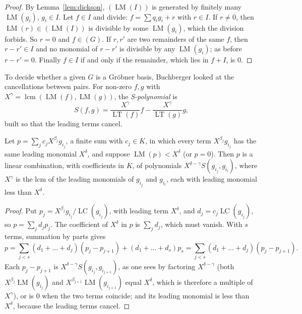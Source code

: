 \begin{proof}
By Lemma~\ref{lem:dickson}, $(\operatorname{LM}(I))$ is generated by finitely many $\operatorname{LM}(g_i)$, $g_i\in I$. Let $f\in I$ and divide: $f=\sum q_ig_i+r$ with $r\in I$. If $r\ne0$, then $\operatorname{LM}(r)\in(\operatorname{LM}(I))$ is divisible by some
$\operatorname{LM}(g_i)$, which the division forbids. So $r=0$ and $f\in(G)$. If $r,r'$ are two remainders of the same $f$, then $r-r'\in I$ and no monomial of $r-r'$ is divisible by any $\operatorname{LM}(g_i)$; as before $r-r'=0$. Finally
$f\in I$ if and only if the remainder, which lies in $f+I$, is $0$.
\end{proof}

To decide whether a given $G$ is a Gröbner basis, Buchberger looked at the cancellations between pairs. For non-zero $f,g$ with $X^\gamma=\operatorname{lcm}(\operatorname{LM}(f),\operatorname{LM}(g))$, the \emph{S-polynomial} is
\[S(f,g)=\frac{X^\gamma}{\operatorname{LT}(f)}f-\frac{X^\gamma}{\operatorname{LT}(g)}g,\]
built so that the leading terms cancel.

\begin{lemma}\label{lem:cancel}
Let $p=\sum_jc_jX^{\beta_j}g_{i_j}$, a finite sum with $c_j\in K$, in which every term $X^{\beta_j}g_{i_j}$ has the same leading monomial $X^\delta$, and suppose $\operatorname{LM}(p)<X^\delta$ (or $p=0$). Then $p$ is a linear
combination, with coefficients in $K$, of polynomials $X^{\delta-\gamma}S(g_{i_j},g_{i_l})$, where $X^\gamma$ is the lcm of the leading monomials of $g_{i_j}$ and $g_{i_l}$, each with leading monomial less than $X^\delta$.
\end{lemma}

\begin{proof}
Put $p_j=X^{\beta_j}g_{i_j}/\operatorname{LC}(g_{i_j})$, with leading term $X^\delta$, and $d_j=c_j\operatorname{LC}(g_{i_j})$, so $p=\sum_jd_jp_j$. The coefficient of $X^\delta$ in $p$ is $\sum_jd_j$, which must vanish. With $s$ terms, summation by parts gives
\[p=\sum_{j<s}(d_1+\dots+d_j)(p_j-p_{j+1})+(d_1+\dots+d_s)p_s=\sum_{j<s}(d_1+\dots+d_j)(p_j-p_{j+1}).\]
Each $p_j-p_{j+1}$ is $X^{\delta-\gamma}S(g_{i_j},g_{i_{j+1}})$, as one sees by factoring $X^{\delta-\gamma}$ (both $X^{\beta_j}\operatorname{LM}(g_{i_j})$ and $X^{\beta_{j+1}}\operatorname{LM}(g_{i_{j+1}})$ equal $X^\delta$, which is therefore a multiple of $X^\gamma$), or is $0$
when the two terms coincide; and its leading monomial is less than $X^\delta$, because the leading terms cancel.
\end{proof}


